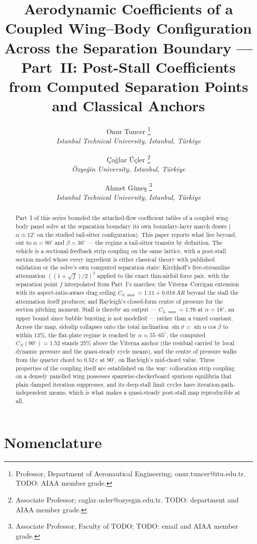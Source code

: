 \documentclass[submit]{aiaa-tc}
\title{Aerodynamic Coefficients of a Coupled Wing--Body Configuration
       Across the Separation Boundary --- Part~II: Post-Stall
       Coefficients from Computed Separation Points and Classical
       Anchors}
\author{
 Onur Tuncer%
  \thanks{Professor, Department of Aeronautical Engineering;
    onur.tuncer@itu.edu.tr. TODO: AIAA member grade.}\\
 {\normalsize\itshape
  Istanbul Technical University, Istanbul, T\"urkiye}
 \and
 \c{C}a\u{g}lar \"U\c{c}ler%
  \thanks{Associate Professor; caglar.ucler@ozyegin.edu.tr.
    TODO: department and AIAA member grade.}\\
 {\normalsize\itshape
  \"Ozye\u{g}in University, Istanbul, T\"urkiye}
 \and
 Ahmet G\"une\c{s}%
  \thanks{Associate Professor, Faculty of TODO; TODO: email and AIAA
    member grade.}\\
 {\normalsize\itshape
  Istanbul Technical University, Istanbul, T\"urkiye}
}
\begin{document}
\maketitle

\begin{abstract}
Part~I of this series bounded the attached-flow coefficient tables of a
coupled wing--body panel solve at the separation boundary its own
boundary-layer march draws ($\alpha \approx 12^\circ$ on the studied
tail-sitter configuration). This paper reports what lies beyond, out to
$\alpha = 90^\circ$ and $\beta = 30^\circ$ --- the regime a tail-sitter
transits by definition. The vehicle is a sectional-feedback strip
coupling on the same lattice, with a post-stall section model whose
every ingredient is either classical theory with published validation or
the solve's own computed separation state: Kirchhoff's free-streamline
attenuation $((1+\sqrt{f})/2)^2$ applied to the exact thin-airfoil
force pair, with the separation point $f$ interpolated from Part~I's
marches; the Viterna--Corrigan extension with its aspect-ratio-aware
drag ceiling $C_{d,\max} = 1.11 + 0.018\,A\!R$ beyond the stall the
attenuation itself produces; and Rayleigh's closed-form centre of
pressure for the section pitching moment. Stall is thereby an output ---
$C_{L,\max} = 1.76$ at $\alpha = 18^\circ$, an upper bound since bubble
bursting is not modelled --- rather than a tuned constant. Across the
map, sideslip collapses onto the total inclination
$\sin\sigma = \sin\alpha\cos\beta$ to within 13\%, the flat-plate regime
is reached by $\alpha \approx 55$--$65^\circ$, the computed
$C_N(90^\circ) = 1.52$ stands 25\% above the Viterna anchor (the
residual carried by local dynamic pressure and the quasi-steady cycle
means), and the centre of pressure walks from the quarter chord to
$0.52\,c$ at $90^\circ$, on Rayleigh's mid-chord value. Three properties
of the coupling itself are established on the way: collocation strip
coupling on a densely panelled wing possesses spanwise-checkerboard
spurious equilibria that plain damped iteration suppresses, and its
deep-stall limit cycles have iteration-path-independent means, which is
what makes a quasi-steady post-stall map reproducible at all.
\end{abstract}

\section*{Nomenclature}
\end{document}
